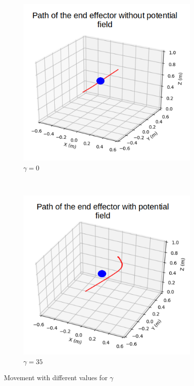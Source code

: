 \documentclass[a4paper, 11.5pt, conference]{ieeeconf}      %
\begin{document}
\begin{figure}[H]
	\centering
	\label{potential}
	\begin{subfigure}[t]{0.20\textwidth}
		\centering
		\includegraphics[scale=0.35]{images/no_potential.png}
		\caption{$\gamma = 0$}
	\end{subfigure}%
	~ 
	\begin{subfigure}[t]{0.20\textwidth}
		\centering
		\includegraphics[scale=0.35]{images/yes_potential.png}
		\caption{$\gamma = 35$}
	\end{subfigure}
	\caption{Movement with different values for $\gamma$}
\end{figure}
\end{document}

